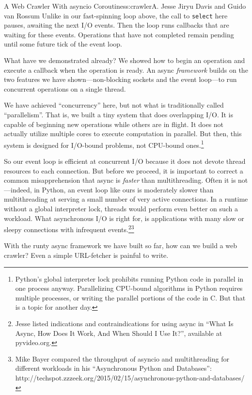 \begin{aosachapter}{A Web Crawler With asyncio Coroutines}{s:crawler}{A. Jesse Jiryu Davis and Guido van Rossum}
Unlike in our fast-spinning loop above, the call to \texttt{select} here
pauses, awaiting the next I/O events. Then the loop runs callbacks that
are waiting for these events. Operations that have not completed remain
pending until some future tick of the event loop.

What have we demonstrated already? We showed how to begin an operation
and execute a callback when the operation is ready. An async
\emph{framework} builds on the two features we have shown---non-blocking
sockets and the event loop---to run concurrent operations on a single
thread.

We have achieved ``concurrency'' here, but not what is traditionally
called ``parallelism''. That is, we built a tiny system that does
overlapping I/O. It is capable of beginning new operations while others
are in flight. It does not actually utilize multiple cores to execute
computation in parallel. But then, this system is designed for I/O-bound
problems, not CPU-bound ones.\footnote{Python's global interpreter lock
  prohibits running Python code in parallel in one process anyway.
  Parallelizing CPU-bound algorithms in Python requires multiple
  processes, or writing the parallel portions of the code in C. But that
  is a topic for another day.}

So our event loop is efficient at concurrent I/O because it does not
devote thread resources to each connection. But before we proceed, it is
important to correct a common misapprehension that async is
\emph{faster} than multithreading. Often it is not---indeed, in Python,
an event loop like ours is moderately slower than multithreading at
serving a small number of very active connections. In a runtime without
a global interpreter lock, threads would perform even better on such a
workload. What asynchronous I/O is right for, is applications with many
slow or sleepy connections with infrequent events.\footnote{Jesse listed
  indications and contraindications for using async in ``What Is Async,
  How Does It Work, And When Should I Use It?'', available at
  pyvideo.org.}\footnote{Mike Bayer compared the throughput of asyncio
  and multithreading for different workloads in his ``Asynchronous
  Python and Databases'':
  http://techspot.zzzeek.org/2015/02/15/asynchronous-python-and-databases/}

\label{programming-with-callbacks}

With the runty async framework we have built so far, how can we build a
web crawler? Even a simple URL-fetcher is painful to write.


\end{aosachapter}
